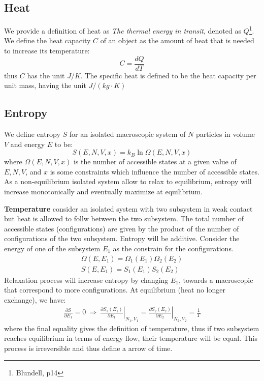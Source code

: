 \documentclass{article}
\begin{document}
\subsection{Heat}
We provide a definition of heat as \emph{The thermal energy in transit}, denoted as $Q$\footnote{Blundell, p14}. We define the heat capacity
$C$ of an object as the amount of heat that is needed to increase its temperature:
\begin{equation}
    C = \frac{dQ}{dT}
\end{equation}
thus $C$ has the unit $J/K$. The specific heat is defined to be the heat capacity per unit mass, having the unit $J/(kg\cdot K)$

\subsection{Entropy}
We define entropy $S$ for an isolated macroscopic system of $N$ particles in volume $V$ and energy $E$ to be:
\begin{equation}
    S(E,N,V,x) = k_B \ln\Omega(E,N,V,x)
\end{equation}
where $\Omega(E,N,V,x)$ is the number of accessible states at a given value of $E, N, V$, and $x$ is some constraints which 
influence the number of accessible states.
As a non-equilibrium isolated system allow to relax to equilibrium, entropy will increase monotonically and eventually maximize 
at equilibrium.

\textbf{Temperature} 
consider an isolated system with two subsystem in weak contact but heat is allowed to follw between the two subsystem.
The total number of accessible states (configurations) are given by the product of the number of configurations of the 
two subsystem. Entropy will be additive. Consider the energy of one of the subsystem $E_1$
as the constrain for the configurations.
\begin{align}
    \Omega(E,E_1) = \Omega_1(E_1) \Omega_2(E_2) \\
    S(E,E_1) = S_1(E_1) S_2(E_2)   
\end{align}
Relaxation process will increase entropy by changing $E_1$, towards a macroscopic that correspond to 
more configurations. At equilibrium (heat no longer exchange), we have:
\begin{gather}
    \frac{\partial S}{\partial E_1} = 0 \ \Rightarrow \ 
    \left. \frac{\partial S_1(E_1)}{\partial E_1} \right|_{N_1,V_1} = \left. \frac{\partial S_2(E_2)}{\partial E_2}\right|_{N_2,V_2} = \frac{1}{T} \label{defineT}
\end{gather}
where the final equality gives the definition of temperature, thus if two subsystem reaches equilibrium in terms of energy flow, their 
temperature will be equal. This process is irreversible and thus define a arrow of time.
\end{document}
